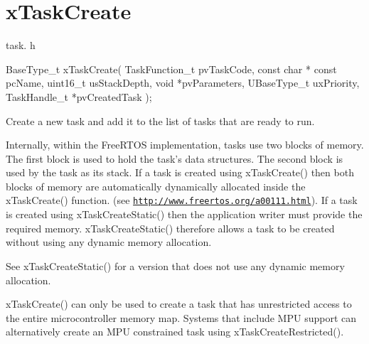 \hypertarget{group__xTaskCreate}{\section{x\-Task\-Create}
\label{group__xTaskCreate}
}
task. h 
\begin{DoxyPre}
 BaseType\_t xTaskCreate(
                              TaskFunction\_t pvTaskCode,
                              const char * const pcName,
                              uint16\_t usStackDepth,
                              void *pvParameters,
                              UBaseType\_t uxPriority,
                              TaskHandle\_t *pvCreatedTask
                          );\end{DoxyPre}


Create a new task and add it to the list of tasks that are ready to run.

Internally, within the Free\-R\-T\-O\-S implementation, tasks use two blocks of memory. The first block is used to hold the task's data structures. The second block is used by the task as its stack. If a task is created using x\-Task\-Create() then both blocks of memory are automatically dynamically allocated inside the x\-Task\-Create() function. (see \href{http://www.freertos.org/a00111.html}{\tt http\-://www.\-freertos.\-org/a00111.\-html}). If a task is created using x\-Task\-Create\-Static() then the application writer must provide the required memory. x\-Task\-Create\-Static() therefore allows a task to be created without using any dynamic memory allocation.

See x\-Task\-Create\-Static() for a version that does not use any dynamic memory allocation.

x\-Task\-Create() can only be used to create a task that has unrestricted access to the entire microcontroller memory map. Systems that include M\-P\-U support can alternatively create an M\-P\-U constrained task using x\-Task\-Create\-Restricted().


